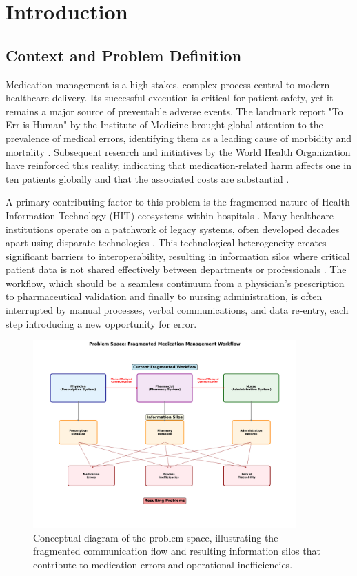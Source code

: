 \chapter{Introduction}

\section{Context and Problem Definition}

Medication management is a high-stakes, complex process central to modern healthcare delivery. Its successful execution is critical for patient safety, yet it remains a major source of preventable adverse events. The landmark report "To Err is Human" by the Institute of Medicine brought global attention to the prevalence of medical errors, identifying them as a leading cause of morbidity and mortality \cite{kohn2000}. Subsequent research and initiatives by the World Health Organization have reinforced this reality, indicating that medication-related harm affects one in ten patients globally and that the associated costs are substantial \cite{who2017, who2022}.

A primary contributing factor to this problem is the fragmented nature of Health Information Technology (HIT) ecosystems within hospitals \cite{berwick2008}. Many healthcare institutions operate on a patchwork of legacy systems, often developed decades apart using disparate technologies \cite{kazemi2016}. This technological heterogeneity creates significant barriers to interoperability, resulting in information silos where critical patient data is not shared effectively between departments or professionals \cite{keasberry2017}. The workflow, which should be a seamless continuum from a physician's prescription to pharmaceutical validation and finally to nursing administration, is often interrupted by manual processes, verbal communications, and data re-entry, each step introducing a new opportunity for error.

\begin{figure}[htbp]
    \centering
    \includegraphics[width=0.9\textwidth]{images/generated/problem_space_diagram.png}
    \caption{Conceptual diagram of the problem space, illustrating the fragmented communication flow and resulting information silos that contribute to medication errors and operational inefficiencies.}
    \label{fig:problem_space}
\end{figure}

